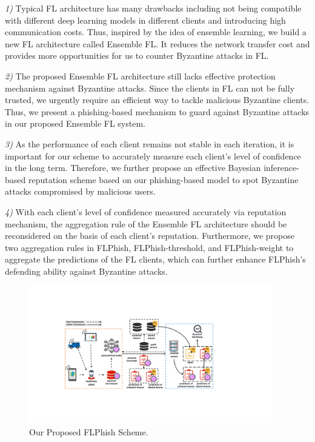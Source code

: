 \documentclass[journal]{IEEEtran}
\begin{document}
\par \textit{1)} Typical FL architecture has many drawbacks including not being compatible with different deep learning models in different clients and introducing high communication costs. Thus, inspired by the idea of ensemble learning, we build a new FL architecture called Ensemble FL. It reduces the network transfer cost and provides more opportunities for us to counter Byzantine attacks in FL.
\par \textit{2)} The proposed Ensemble FL architecture still lacks effective protection mechanism against Byzantine attacks. Since the clients in FL can not be fully trusted, we urgently require an efficient way to tackle malicious Byzantine clients. Thus, we present a phishing-based mechanism to guard against Byzantine attacks in our proposed Ensemble FL system.
\par \textit{3)} As the performance of each client remains not stable in each iteration, it is important for our scheme to accurately measure each client's level of confidence in the long term. Therefore, we further propose an effective Bayesian inference-based reputation scheme based on our phishing-based model to spot Byzantine attacks compromised by malicious users.
\par \textit{4)} With each client's level of confidence measured accurately via reputation mechanism, the aggregation rule of the Ensemble FL architecture should be reconsidered on the basis of each client's reputation. Furthermore, we propose two aggregation rules in FLPhish, FLPhish-threshold, and FLPhish-weight to aggregate the predictions of the FL clients, which can further enhance FLPhish's defending ability against Byzantine attacks.


  \begin{figure}
    \centering
  \includegraphics[width=0.95\textwidth]{figures/Figure_FLPhish.pdf}
  \caption{Our Proposed FLPhish Scheme.}
  \label{fig_Phishing}
  \end{figure}   
  
\end{document}
